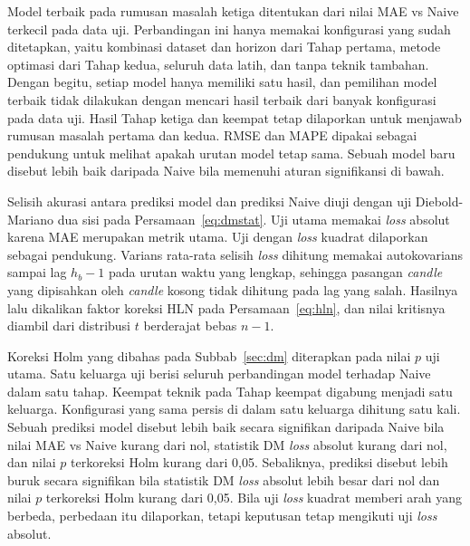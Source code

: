 Model terbaik pada rumusan masalah ketiga ditentukan dari nilai MAE vs Naive
terkecil pada data uji. Perbandingan ini hanya memakai konfigurasi yang
sudah ditetapkan, yaitu kombinasi dataset dan horizon dari Tahap pertama,
metode optimasi dari Tahap kedua, seluruh data latih, dan
tanpa teknik tambahan. Dengan begitu, setiap model hanya memiliki satu hasil,
dan pemilihan model terbaik tidak dilakukan dengan mencari hasil terbaik dari
banyak konfigurasi pada data uji. Hasil Tahap ketiga dan keempat tetap
dilaporkan untuk menjawab rumusan masalah pertama dan kedua. RMSE dan MAPE dipakai sebagai pendukung untuk
melihat apakah urutan model tetap sama. Sebuah model baru disebut lebih baik
daripada Naive bila memenuhi aturan signifikansi di bawah.

Selisih akurasi antara prediksi model dan prediksi Naive diuji dengan uji
Diebold-Mariano dua sisi pada Persamaan~\eqref{eq:dmstat}. Uji utama memakai
\textit{loss} absolut karena MAE merupakan metrik utama. Uji dengan
\textit{loss} kuadrat dilaporkan sebagai pendukung. Varians rata-rata selisih
\textit{loss} dihitung memakai autokovarians sampai lag $h_b - 1$ pada urutan waktu yang lengkap, sehingga pasangan \textit{candle} yang dipisahkan oleh \textit{candle} kosong
tidak dihitung pada lag yang salah. Hasilnya lalu dikalikan faktor koreksi
HLN pada Persamaan~\eqref{eq:hln}, dan nilai kritisnya diambil dari
distribusi $t$ berderajat bebas $n - 1$.

Koreksi Holm yang dibahas pada Subbab~\ref{sec:dm} diterapkan pada nilai $p$
uji utama. Satu keluarga uji berisi seluruh perbandingan model terhadap Naive
dalam satu tahap. Keempat teknik pada Tahap keempat digabung menjadi satu
keluarga. Konfigurasi yang sama persis di dalam satu keluarga dihitung satu
kali. Sebuah prediksi model disebut lebih baik secara
signifikan daripada Naive bila nilai MAE vs Naive kurang dari nol, statistik
DM \textit{loss} absolut kurang dari nol, dan nilai $p$ terkoreksi Holm kurang
dari 0,05. Sebaliknya, prediksi disebut lebih buruk secara signifikan bila
statistik DM \textit{loss} absolut lebih besar dari nol dan nilai $p$
terkoreksi Holm kurang dari 0,05. Bila uji \textit{loss} kuadrat memberi arah
yang berbeda, perbedaan itu dilaporkan, tetapi keputusan tetap mengikuti uji
\textit{loss} absolut.

